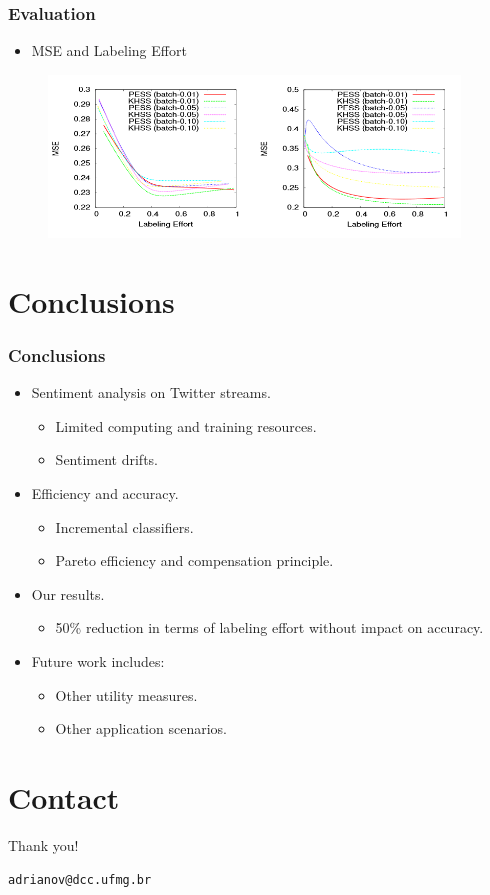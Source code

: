 \documentclass[14pt]{beamer}
\begin{document}
\begin{frame}\frametitle{Evaluation}

\begin{itemize}
\item MSE and Labeling Effort
\end{itemize}

\begin{figure}
\centering
\includegraphics[height=1.70in]{results2}
\end{figure}

\end{frame}


\section{Conclusions}

\begin{frame}\frametitle{Conclusions}

\begin{itemize}
\item Sentiment analysis on Twitter streams.
\begin{itemize}
\item Limited computing and training resources.
\item Sentiment drifts.
\end{itemize}
\item Efficiency and accuracy.
\begin{itemize}
\item Incremental classifiers.
\item Pareto efficiency and compensation principle.
\end{itemize}
\item Our results.
\begin{itemize}
\item 50\% reduction in terms of labeling effort without impact on accuracy.
\end{itemize}
\item Future work includes:
\begin{itemize}
\item Other utility measures.
\item Other application scenarios.
\end{itemize}
\end{itemize}

\end{frame}






\section{Contact}
\begin{frame}{Thank you!}
\begin{center}
\tt adrianov@dcc.ufmg.br\\
\end{center}
\end{frame}
\end{document}
